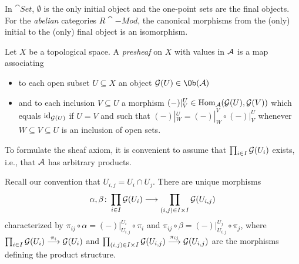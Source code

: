 \documentclass[a4paper,parskip=half,numbers=enddot, DIV=12]{scrreprt}
\begin{document}
  \begin{rem*}
  	In $\cat{Set}$, $\emptyset$ is the only initial object and the one-point sets are the final objects. For the \emph{abelian} categories $R\cat{-Mod}$, the canonical morphisms from the (only) initial to the (only) final object is an isomorphism.
  \end{rem*}
	Let $X$ be a topological space. A \emph{presheaf} on $X$ with values in $\mathcal{A}$ is a map associating
	\begin{itemize}
		\item to each open subset $U\subseteq X$ an object $\Gg(U)\in\Ob(\Aa)$
		\item and to each inclusion $V\subseteq U$ a morphism $(-)|_V^U\in\operatorname{Hom}_{\mathcal{A}}(\mathcal{G}(U), \mathcal{G}(V))$ which equals $\operatorname{id}_{\mathcal{G}(U)}$ if $U=V$ and such that $(-)|_W^U=(-)|_W^V\circ(-)|_V^U$ whenever $W\subseteq V\subseteq U$ is an inclusion of open sets.
	\end{itemize}
	To formulate the sheaf axiom, it is convenient to assume that $\prod_{i\in I}\mathcal{G}(U_i)$ exists, i.e., that $\mathcal{A}$ has arbitrary products.
	
	Recall our convention that $U_{i,j}=U_i\cap U_j$. There are unique morphisms
	\begin{align*}
		\alpha,\beta\colon \prod_{i\in I}\mathcal{G}(U_i)\longrightarrow\prod_{(i,j)\in I\times I}\mathcal{G}(U_{i,j})
	\end{align*}
	characterized by $\pi_{ij}\circ\alpha=(-)|_{U_{i,j}}^{U_i}\circ\pi_i$ and $\pi_{ij}\circ\beta=(-)|_{U_{i,j}}^{U_j}\circ\pi_j$, where $\prod_{i\in I}\Gg(U_i)\morphism[\pi_i]\Gg(U_i)$ and $\prod_{(i,j)\in I\times I}\Gg(U_{i,j})\morphism[\pi_{ij}]\Gg(U_{i,j})$ are the morphisms defining the product structure.
	
\end{document}
